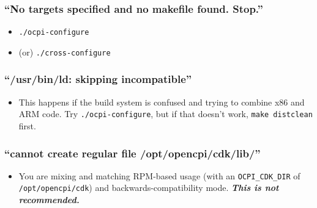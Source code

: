 \begin{appendices}
\subsubsection{``No targets specified and no makefile found.  Stop.''}
\begin{itemize}
\item \verb+./ocpi-configure+
\item (or) \verb+./cross-configure+
\end{itemize}

\subsubsection{``/usr/bin/ld: skipping incompatible''}
\begin{itemize}
\item This happens if the build system is confused and trying to combine x86 and ARM code. Try \verb+./ocpi-configure+, but if that doesn't work, \verb+make distclean+ first.
\end{itemize}

\subsubsection{``cannot create regular file /opt/opencpi/cdk/lib/''}
\begin{itemize}
\item You are mixing and matching RPM-based usage (with an \verb+OCPI_CDK_DIR+ of \verb+/opt/opencpi/cdk+) and backwards-compatibility mode. \textbf{\textit{This is not recommended.}}
\end{itemize}

\end{appendices}

